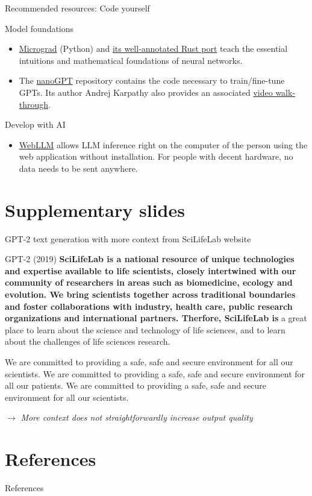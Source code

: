 \documentclass[10pt]{beamer}
\newcommand{\remark}[1]{{\par \color{scGrape} \ensuremath{\rightarrow} \emph{#1}}}
\begin{document}
\begin{frame}{Recommended resources: Code yourself}
	\begin{block}{Model foundations}
		\begin{itemize}
			\item  \href{https://github.com/karpathy/micrograd}{Micrograd} (Python) and \href{https://github.com/sebinsua/micrograd-rs/blob/main/src/nn.rs}{its well-annotated Rust port}  teach the essential intuitions and mathematical foundations of neural networks.
			\item The \href{https://github.com/karpathy/nanoGPT}{nanoGPT} repository contains the code necessary to train/fine-tune GPTs. Its author Andrej Karpathy also provides an associated \href{https://www.youtube.com/watch?v=kCc8FmEb1nY}{video walk-through}.   
		\end{itemize}
	\end{block}
	\begin{block}{Develop with AI}
	\begin{itemize}
		\item \href{https://github.com/mlc-ai/web-llm}{WebLLM} allows LLM inference right on the computer of the person using the web application without installation. For people with decent hardware, no data needs to be sent anywhere. 
	\end{itemize}
\end{block}
\end{frame}


\section{Supplementary slides}

\begin{frame}{GPT-2 text generation with more context from SciLifeLab website}
	
	\begin{alertblock}{GPT-2 (2019) }
		\small
		\textbf{SciLifeLab is a national resource of unique technologies and expertise available to life scientists, closely intertwined with our community of researchers in areas such as biomedicine, ecology and evolution. We bring scientists together across traditional boundaries and foster collaborations with industry, health care, public research organizations and international partners. Therfore, SciLifeLab is}  a great place to learn about the science and technology of life sciences, and to learn about the challenges of life sciences research.
		
		We are committed to providing a safe, safe and secure environment for all our scientists. We are committed to providing a safe, safe and secure environment for all our patients. We are committed to providing a safe, safe and secure environment for all our scientists.
	\end{alertblock}
	\remark{More context does not straightforwardly increase output quality}
\end{frame}


\section{References}
\begin{frame}[allowframebreaks]{References}
\begingroup
\renewcommand*{\bibfont}{\footnotesize} 
\printbibliography[heading=none]
\endgroup
\end{frame}
\end{document}
